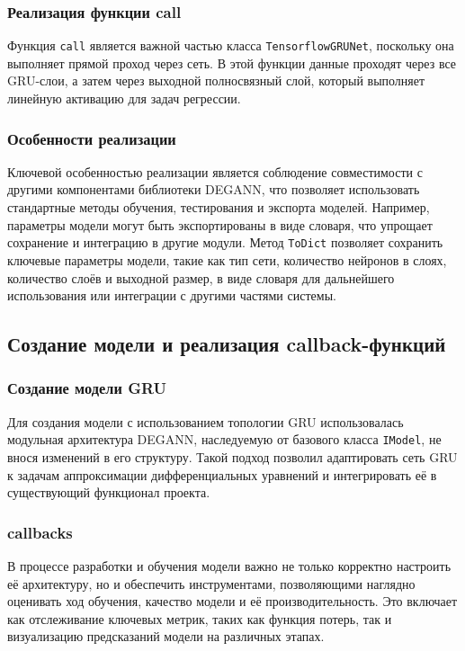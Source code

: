 \subsubsection{Реализация функции call}
Функция \texttt{call} является важной частью класса \texttt{TensorflowGRUNet}, поскольку она выполняет прямой проход через сеть. В этой функции данные проходят через все GRU-слои, а затем через выходной полносвязный слой, который выполняет линейную активацию для задач регрессии.

\subsubsection{Особенности реализации}
Ключевой особенностью реализации является соблюдение совместимости с другими компонентами библиотеки DEGANN, что позволяет использовать стандартные методы обучения, тестирования и экспорта моделей. Например, параметры модели могут быть экспортированы в виде словаря, что упрощает сохранение и интеграцию в другие модули. Метод \texttt{ToDict} позволяет сохранить ключевые параметры модели, такие как тип сети, количество нейронов в слоях, количество слоёв и выходной размер, в виде словаря для дальнейшего использования или интеграции с другими частями системы.




\subsection{Создание модели и реализация callback-функций}
\label{subsec:model_callbacks}

\subsubsection{Создание модели GRU}
Для создания модели с использованием топологии GRU использовалась модульная архитектура DEGANN, наследуемую от базового класса \texttt{IModel}, не внося изменений в его структуру. Такой подход позволил адаптировать сеть GRU к задачам аппроксимации дифференциальных уравнений и интегрировать её в существующий функционал проекта.

\subsubsection{callbacks}
В процессе разработки и обучения модели важно не только корректно настроить её архитектуру, но и обеспечить инструментами, позволяющими наглядно оценивать ход обучения, качество модели и её производительность. Это включает как отслеживание ключевых метрик, таких как функция потерь, так и визуализацию предсказаний модели на различных этапах.

